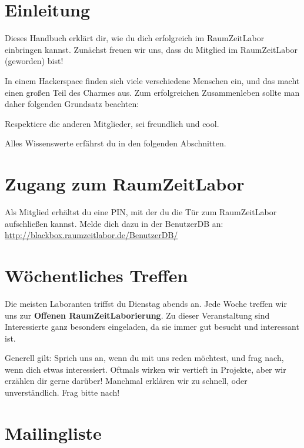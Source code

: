 \documentclass[12pt, DIV16, a4paper]{scrartcl}
\begin{document}
\pagestyle{fancy}
\newcommand{\np}{\bigskip\noindent}
\setlength{\parindent}{0pt}

\section*{Einleitung}

Dieses Handbuch erklärt dir, wie du dich erfolgreich im RaumZeitLabor
einbringen kannst. Zunächst freuen wir uns, dass du Mitglied im RaumZeitLabor
(geworden) bist!
\np

In einem Hackerspace finden sich viele verschiedene Menschen ein, und das macht
einen großen Teil des Charmes aus. Zum erfolgreichen Zusammenleben sollte man
daher folgenden Grundsatz beachten:

\begin{center}
	Respektiere die anderen Mitglieder, sei freundlich und cool.
\end{center}

Alles Wissenswerte erfährst du in den folgenden Abschnitten.

\section*{Zugang zum RaumZeitLabor}

Als Mitglied erhältst du eine PIN, mit der du die Tür zum RaumZeitLabor
aufschließen kannst. Melde dich dazu in der BenutzerDB an:\\
\url{http://blackbox.raumzeitlabor.de/BenutzerDB/}

\section*{Wöchentliches Treffen}

Die meisten Laboranten triffst du Dienstag abends an. Jede Woche treffen wir
uns zur \textbf{Offenen RaumZeitLaborierung}. Zu dieser Veranstaltung sind
Interessierte ganz besonders eingeladen, da sie immer gut besucht und
interessant ist.
\np

Generell gilt: Sprich uns an, wenn du mit uns reden möchtest, und frag nach,
wenn dich etwas interessiert. Oftmals wirken wir vertieft in Projekte, aber wir
erzählen dir gerne darüber! Manchmal erklären wir zu schnell, oder
unverständlich. Frag bitte nach!

\section*{Mailingliste}
\end{document}
